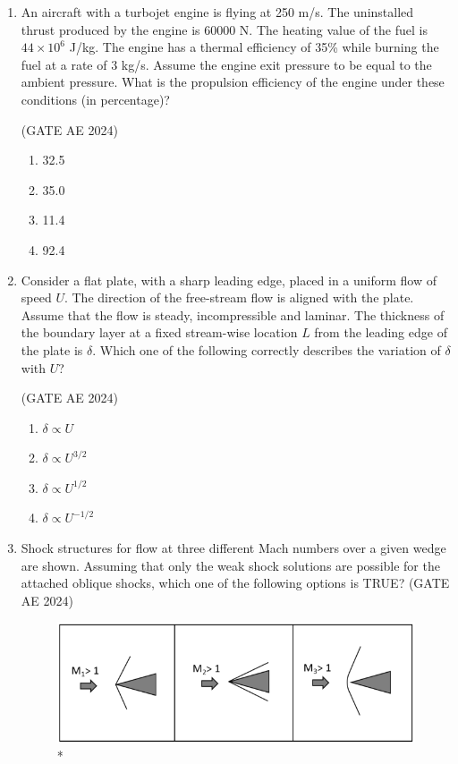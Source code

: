 \documentclass[journal,12pt,onecolumn]{IEEEtran}
\theoremstyle{remark}
\begin{document}
\begin{flushleft}
\begin{enumerate}
\item An aircraft with a turbojet engine is flying at 250 m/s. The uninstalled thrust produced by the engine is 60000 N. The heating value of the fuel is $44 \times 10^6$ J/kg. The engine has a thermal efficiency of 35\% while burning the fuel at a rate of 3 kg/s. Assume the engine exit pressure to be equal to the ambient pressure. What is the propulsion efficiency of the engine under these conditions (in percentage)?

\hfill (GATE AE 2024)

\begin{enumerate}
    \item 32.5
    \item 35.0
    \item 11.4
    \item 92.4
\end{enumerate}

\item  Consider a flat plate, with a sharp leading edge, placed in a uniform flow of speed $U$. The direction of the free-stream flow is aligned with the plate. Assume that the flow is steady, incompressible and laminar. The thickness of the boundary layer at a fixed stream-wise location $L$ from the leading edge of the plate is $\delta$. Which one of the following correctly describes the variation of $\delta$ with $U$?  

\hfill (GATE AE 2024)

\begin{enumerate}
\item $\delta \propto U$  
\item $\delta \propto U^{3/2}$  
\item $\delta \propto U^{1/2}$  
\item $\delta \propto U^{-1/2}$ 
\end{enumerate} 


\item Shock structures for flow at three different Mach numbers over a given wedge are shown. Assuming that only the weak shock solutions are possible for the attached oblique shocks, which one of the following options is TRUE?  
\hfill (GATE AE 2024)

\begin{figure}[H]
\includegraphics[width=0.5\columnwidth]{figs/43.png}
\caption{*}
    \label{fig:placeholder}
\end{figure}


\end{enumerate}
\end{flushleft}
\end{document}
